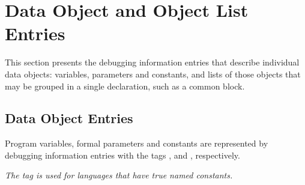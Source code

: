 \chapter[Data Object and Object List]{Data Object and Object List Entries}
\label{chap:dataobjectandobjectlistentries}

This section presents the debugging information entries that
describe individual data objects: variables, parameters and
constants, and lists of those objects that may be grouped in
a single declaration, such as a common block.

\section{Data Object Entries}
\label{chap:dataobjectentries}


Program variables, formal parameters and constants are
represented by debugging information entries with the tags
, 
 and 
,
respectively.

\textit{The tag  is used for languages that
have true named constants.}


